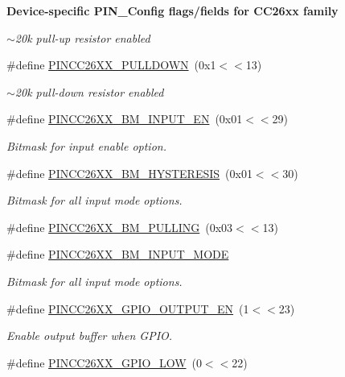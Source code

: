 \begin{Indent}{\bf Device-\/specific P\+I\+N\+\_\+\+Config flags/fields for C\+C26xx family}
\begin{DoxyCompactItemize}
\begin{DoxyCompactList}\small\item\em $\sim$20k pull-\/up resistor enabled \end{DoxyCompactList}\item 
\#define \hyperlink{_p_i_n_c_c26_x_x_8h_a3fac53dff43a2718044afdcdfa916d53}{P\+I\+N\+C\+C26\+X\+X\+\_\+\+P\+U\+L\+L\+D\+O\+W\+N}~(0x1$<$$<$13)
\begin{DoxyCompactList}\small\item\em $\sim$20k pull-\/down resistor enabled \end{DoxyCompactList}\item 
\#define \hyperlink{_p_i_n_c_c26_x_x_8h_a2597baf0e1d85b01a0c953399b3ac8d8}{P\+I\+N\+C\+C26\+X\+X\+\_\+\+B\+M\+\_\+\+I\+N\+P\+U\+T\+\_\+\+E\+N}~(0x01$<$$<$29)
\begin{DoxyCompactList}\small\item\em Bitmask for input enable option. \end{DoxyCompactList}\item 
\#define \hyperlink{_p_i_n_c_c26_x_x_8h_a58d1d38ce029a08e7b7daefa5a37b36d}{P\+I\+N\+C\+C26\+X\+X\+\_\+\+B\+M\+\_\+\+H\+Y\+S\+T\+E\+R\+E\+S\+I\+S}~(0x01$<$$<$30)
\begin{DoxyCompactList}\small\item\em Bitmask for all input mode options. \end{DoxyCompactList}\item 
\#define \hyperlink{_p_i_n_c_c26_x_x_8h_af544027abbe329d9bfab802d28db85b6}{P\+I\+N\+C\+C26\+X\+X\+\_\+\+B\+M\+\_\+\+P\+U\+L\+L\+I\+N\+G}~(0x03$<$$<$13)
\item 
\#define \hyperlink{_p_i_n_c_c26_x_x_8h_a4d6f0a3f1a8dcede9f92055d6d581d5f}{P\+I\+N\+C\+C26\+X\+X\+\_\+\+B\+M\+\_\+\+I\+N\+P\+U\+T\+\_\+\+M\+O\+D\+E}
\begin{DoxyCompactList}\small\item\em Bitmask for all input mode options. \end{DoxyCompactList}\item 
\#define \hyperlink{_p_i_n_c_c26_x_x_8h_aef729e00581046126a8ddfaaffd89c12}{P\+I\+N\+C\+C26\+X\+X\+\_\+\+G\+P\+I\+O\+\_\+\+O\+U\+T\+P\+U\+T\+\_\+\+E\+N}~(1$<$$<$23)
\begin{DoxyCompactList}\small\item\em Enable output buffer when G\+P\+I\+O. \end{DoxyCompactList}\item 
\#define \hyperlink{_p_i_n_c_c26_x_x_8h_a8c77c9ca4b7ea3c71ad06dd0a969533f}{P\+I\+N\+C\+C26\+X\+X\+\_\+\+G\+P\+I\+O\+\_\+\+L\+O\+W}~(0$<$$<$22)

\end{DoxyCompactItemize}
\end{Indent}
